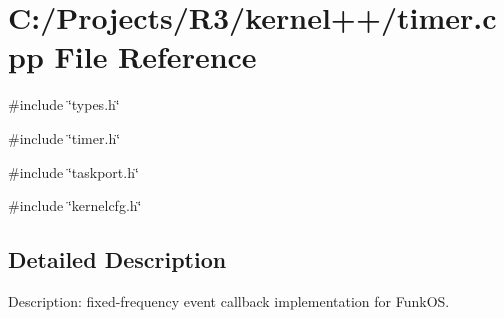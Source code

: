 \section{C:/Projects/R3/kernel++/timer.cpp File Reference}
\label{timer_8cpp}
{\ttfamily \#include \char`\"{}types.h\char`\"{}}\par
{\ttfamily \#include \char`\"{}timer.h\char`\"{}}\par
{\ttfamily \#include \char`\"{}taskport.h\char`\"{}}\par
{\ttfamily \#include \char`\"{}kernelcfg.h\char`\"{}}\par


\subsection{Detailed Description}
Description: fixed-\/frequency event callback implementation for FunkOS. 